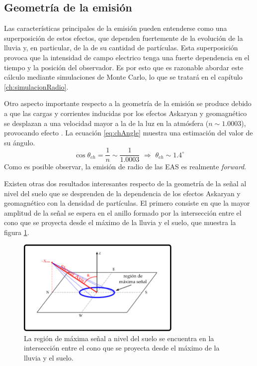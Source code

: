 	
	\subsection{Geometr\'ia de la emisi\'on}
	\label{sbsc:geom_emision}
	
	Las características principales de la emisión pueden entenderse como una superposición de estos efectos, que dependen fuertemente de la evolución de la lluvia y, en particular, de la de su cantidad de partículas.
	Esta superposición provoca que la intensidad de campo electrico tenga una fuerte dependencia en el tiempo y la posición del observador.
	Es por esto que es razonable abordar este cálculo mediante simulaciones de Monte Carlo, lo que se tratará en el capítulo \ref{ch:simulacionRadio}.
	
	Otro aspecto importante respecto a la geometría de la emisión se produce debido a que las cargas y corrientes inducidas por los efectos Askaryan y geomagn\'etico se desplazan a una velocidad mayor a la de la luz en la atm\'osfera ($n\sim1.0003$), provocando efecto \cher{}.
	La ecuación \ref{eq:chAngle} muestra una estimación del valor de su \'angulo.
	\begin{equation}
	\cos\theta_{ch} = \frac{1}{n} \sim \frac{1}{1.0003}
	\,\, \Rightarrow \,\,
	\theta_{ch} \sim 1.4^\circ
	\label{eq:chAngle}
	\end{equation}
	Como es posible observar, la emisi\'on de radio de las EAS es realmente \emph{forward}.
	
	Existen otras dos resultados interesantes respecto de la geometría de la señal al nivel del suelo que se desprenden de la dependencia de los efectos Askaryan y geomagnético con la densidad de partículas.
	El primero consiste en que la mayor amplitud de la señal se espera en el anillo formado por la intersección entre el cono \cher{} que se proyecta desde el máximo de la lluvia y el suelo, que muestra la figura \ref{fig:cono}.
	
	\begin{figure}[ht!]
		\centering
		\includegraphics[width=0.7\textwidth]{fig/EASRadio/chConeSch}
		\caption{\label{fig:cono} La región de máxima señal a nivel del suelo se encuentra en la intersección entre el cono \cher{} que se proyecta desde el máximo de la lluvia y el suelo.}
	\end{figure}
	
